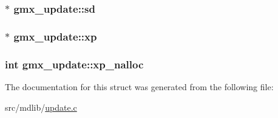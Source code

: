 \hypertarget{structgmx__update_a0a4e6ade92e967c8790e2d607056b6dd}{
\subsubsection[{sd}]{$\ast$ {\bf gmx\-\_\-update\-::sd}}}\label{structgmx__update_a0a4e6ade92e967c8790e2d607056b6dd}
\hypertarget{structgmx__update_a89b863b8be52ee7b33416fae7e5765d1}{
\subsubsection[{xp}]{$\ast$ {\bf gmx\-\_\-update\-::xp}}}\label{structgmx__update_a89b863b8be52ee7b33416fae7e5765d1}
\hypertarget{structgmx__update_a534799aa80e6e0d16f2678f717f74312}{
\subsubsection[{xp\-\_\-nalloc}]{\setlength{\rightskip}{0pt plus 5cm}int {\bf gmx\-\_\-update\-::xp\-\_\-nalloc}}}\label{structgmx__update_a534799aa80e6e0d16f2678f717f74312}


\-The documentation for this struct was generated from the following file\-:\begin{DoxyCompactItemize}
\item 
src/mdlib/\hyperlink{update_8c}{update.\-c}\end{DoxyCompactItemize}
